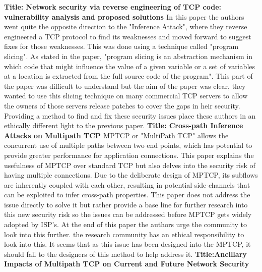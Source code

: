 \documentclass{scrartcl}
\begin{document}
	\newline
	\newline
	\textbf{Title: Network security via reverse engineering of TCP code: vulnerability analysis and proposed solutions \cite{Reverse}}
	\newline
In this paper the authors went quite the opposite direction to the "Inference Attack"\cite{Inference}, where they reverse engineered a TCP protocol to find its weaknesses and moved forward to suggest fixes for those weaknesses. This was done using a technique called "program slicing". As stated in the paper, "program slicing is an abstraction mechanism in which code that might influence the value of a given variable or a set of variables at a location is extracted from the full source code of the program". This part of the paper was difficult to understand but the aim of the paper was clear, they wanted to use this slicing technique on many commercial TCP servers to allow the owners of those servers release patches to cover the gaps in heir security. Providing a method to find and fix these security issues place these authors in an ethically different light to the previous paper.
	\newline
	\newline
	\newline
	\textbf{Title: Cross-path Inference Attacks on Multipath TCP \cite{Cross-Path}}
	\newline
MPTCP or "MultiPath TCP" allows the concurrent use of multiple paths between two end points, which has potential to provide greater performance for application connections. This paper explains the usefulness of MPTCP over standard TCP but also delves into the security risk of having multiple connections. Due to the deliberate design of MPTCP, its subflows are inherently coupled with each other, resulting in potential side-channels that can be exploited to infer cross-path properties. This paper does not address the issue directly to solve it but rather provide a base line for further research into this new security risk so the issues can be addressed before MPTCP gets widely adopted by ISP's. At the end of this paper the authors urge the community to look into this further. the research community has an ethical responsibility to look into this. It seems that as this issue has been designed into the MPTCP, it should fall to the designers of this method to help address it.
	\newline
	\newline
	\newline
	\textbf{Title:Ancillary Impacts of Multipath TCP on Current and Future Network Security \cite{Multipath}}
\end{document}
